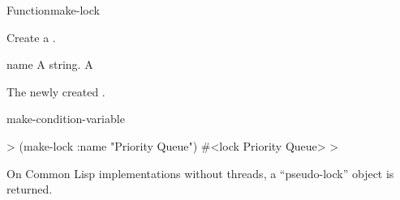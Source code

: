 \documentclass[10pt,twoside,english,pdftex]{article}
\begin{document}

\begin{functiondoc}{Function}{make-lock}{%
    }
%
%
%

\fnsyntax

\fnpurpose Create a .

\fnpackage {}

\fnmodule {}

\fnargs
\begin{args}{name}
\arg[name] A string.
\arg[lock] A 
\end{args}

\fnreturns The newly created . 

\begin{alsos}{make-condition-variable}
\end{alsos}

\fnexample
%
\W\supp
\begin{example}
  > (make-lock :name "Priority Queue")
  #<lock Priority Queue>
  >
\end{example}

\fnnote On Common Lisp implementations without threads, a
``pseudo-lock'' object is returned.

\end{functiondoc}

\end{document}
